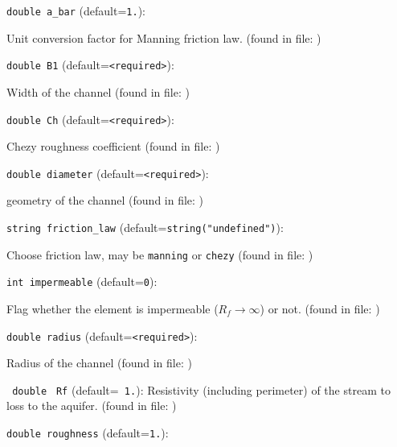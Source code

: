 \item\verb+double a_bar+ {\rm(default=\verb|1.|)}:

Unit conversion factor for Manning friction law.
 (found in file: \verb++)
\item\verb+double B1+ {\rm(default=\verb|<required>|)}:

Width of the channel
 (found in file: \verb++)
\item\verb+double Ch+ {\rm(default=\verb|<required>|)}:

Chezy roughness coefficient
 (found in file: \verb++)
\item\verb+double diameter+ {\rm(default=\verb|<required>|)}:

geometry of the channel
 (found in file: \verb++)
\item\verb+string friction_law+ {\rm(default=\verb|string("undefined")|)}:

Choose friction law, may be {\tt manning} or {\tt chezy}
 (found in file: \verb++)
\item\verb+int impermeable+ {\rm(default=\verb|0|)}:

Flag whether the element is impermeable ($R_f\to\infty$) or not. 
 (found in file: \verb++)
\item\verb+double radius+ {\rm(default=\verb|<required>|)}:

Radius of the channel
 (found in file: \verb++)
\item\verb+ double+ \verb+ Rf+ {\rm(default=\verb| 1.|)}:
 Resistivity (including perimeter) of the stream to 
         loss to the aquifer. 
 (found in file: \verb++)
\item\verb+double roughness+ {\rm(default=\verb|1.|)}:

